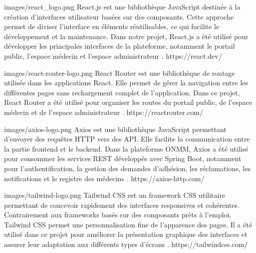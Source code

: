 ﻿\documentclass[12pt,a4paper]{report}
\begin{document}
\techno
{images/react_logo.png}
{React.js}
{est une bibliothèque JavaScript destinée à la création d'interfaces
utilisateur basées sur des composants. Cette approche permet de diviser
l'interface en éléments réutilisables, ce qui facilite le développement et la
maintenance. Dans notre projet, React.js a été utilisé pour développer les
principales interfaces de la plateforme, notamment le portail public, l'espace
médecin et l'espace administrateur \cite{reactDocs}.}
{https://react.dev/}

\techno
{images/react-router-logo.png}
{React Router}
{est une bibliothèque de routage utilisée dans les applications React. Elle
permet de gérer la navigation entre les différentes pages sans rechargement
complet de l'application. Dans ce projet, React Router a été utilisé pour
organiser les routes du portail public, de l'espace médecin et de l'espace
administrateur \cite{reactRouterDocs}.}
{https://reactrouter.com/}

\techno
{images/axios-logo.png}
{Axios}
{est une bibliothèque JavaScript permettant d'envoyer des requêtes HTTP vers
des API. Elle facilite la communication entre la partie frontend et le backend.
Dans la plateforme ONMM, Axios a été utilisé pour consommer les services REST
développés avec Spring Boot, notamment pour l'authentification, la gestion des
demandes d'adhésion, les réclamations, les notifications et le registre des
médecins \cite{axiosDocs}.}
{https://axios-http.com/}

\techno
{images/tailwind-logo.png}
{Tailwind CSS}
{est un framework CSS utilitaire permettant de concevoir rapidement des
interfaces responsives et cohérentes. Contrairement aux frameworks basés sur
des composants prêts à l'emploi, Tailwind CSS permet une personnalisation
fine de l'apparence des pages. Il a été utilisé dans ce projet pour améliorer
la présentation graphique des interfaces et assurer leur adaptation aux
différents types d'écrans \cite{tailwindDocs}.}
{https://tailwindcss.com/}


\end{document}
